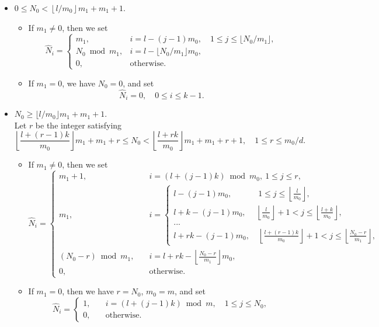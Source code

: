 \documentclass[preprint,3p,10pt]{elsarticle}
\theoremstyle{definition}
\begin{document}
\begin{itemize}
    \item [Case I:]  \(0 \leq N_0 < \left\lfloor l/m_0 \right\rfloor m_1 + m_1 + 1\).
\begin{itemize}
    \item If $m_1\neq 0$,
    then we set
\[
\hat{N}_i = 
\begin{cases}
m_1, & i = l - (j-1)m_0, \quad 1 \leq j \leq \lfloor N_0/m_1 \rfloor, \\
N_0 \bmod m_1, & i = l - \lfloor N_0/m_1 \rfloor m_0, \\
0, & \text{otherwise}.
\end{cases}
\]
    \item If
    $m_1=0$,
     we have $N_0=0$, and set
\begin{equation*}
    \hat{N}_i=0,\quad 0\leq i\leq k-1.
\end{equation*}
\end{itemize}

\item[Case II:] $N_0\geq \lfloor l/m_0\rfloor m_1+m_1+1$.\\   
Let \(r\) be the integer satisfying
\[
\left\lfloor \frac{l + (r-1)k}{m_0} \right\rfloor m_1 + m_1 + r \leq N_0 < \left\lfloor \frac{l + rk}{m_0} \right\rfloor m_1 + m_1 + r + 1,\quad 1\leq r\leq m_0/d.
\]

\begin{itemize}
    \item If $m_1\neq 0$, then we set 
\[
\hat{N}_i=
\begin{cases}
m_1 + 1, & \quad i =  (l + (j-1)k) \bmod{m_0},\ 1 \leq j \leq r,\\
m_1, &  \quad 
i=
\begin{cases}
l - (j-1)m_0, & \ 1 \leq j \leq \left\lfloor \frac{l}{m_0} \right\rfloor,\\
l + k - (j-1)m_0, & \left\lfloor \frac{l}{m_0} \right\rfloor + 1 < j \leq \left\lfloor \frac{l + k}{m_0} \right\rfloor,\\
...\\
l + rk - (j-1)m_0, &\ \left\lfloor \frac{l+(r-1)k}{m_0} \right\rfloor + 1 < j \leq \left\lfloor \frac{N_0-r}{m_1} \right\rfloor,
\end{cases}\\
(N_0 - r) \bmod m_1, & \quad i = l + rk - \left\lfloor \frac{N_0 - r}{m_1} \right\rfloor m_0,\\
0, & \quad \text{otherwise}.
\end{cases}
\]

    
    \item If $m_1=0$, then we have $r=N_0$, $m_0=m$, and set 
\begin{equation*}
    \hat{N}_i=
\begin{cases}
    1, & \quad i= (l+(j-1)k) \bmod{ m},\quad 1\leq j\leq N_0,\\
    0, & \quad \text{otherwise}.
\end{cases}
\end{equation*}


   
\end{itemize}



\end{itemize}
\end{document}
